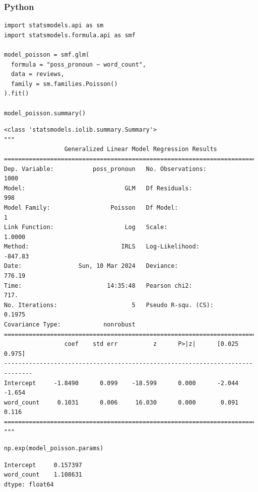 \documentclass[
  letterpaper,
]{krantz}
\begin{document}
\subsubsection{Python}

\begin{verbatim}
import statsmodels.api as sm
import statsmodels.formula.api as smf

model_poisson = smf.glm(
  formula = "poss_pronoun ~ word_count",
  data = reviews,
  family = sm.families.Poisson()
).fit()

model_poisson.summary()        
\end{verbatim}

\begin{verbatim}
<class 'statsmodels.iolib.summary.Summary'>
"""
                 Generalized Linear Model Regression Results                  
==============================================================================
Dep. Variable:           poss_pronoun   No. Observations:                 1000
Model:                            GLM   Df Residuals:                      998
Model Family:                 Poisson   Df Model:                            1
Link Function:                    Log   Scale:                          1.0000
Method:                          IRLS   Log-Likelihood:                -847.83
Date:                Sun, 10 Mar 2024   Deviance:                       776.19
Time:                        14:35:48   Pearson chi2:                     717.
No. Iterations:                     5   Pseudo R-squ. (CS):             0.1975
Covariance Type:            nonrobust                                         
==============================================================================
                 coef    std err          z      P>|z|      [0.025      0.975]
------------------------------------------------------------------------------
Intercept     -1.8490      0.099    -18.599      0.000      -2.044      -1.654
word_count     0.1031      0.006     16.030      0.000       0.091       0.116
==============================================================================
"""
\end{verbatim}

\begin{verbatim}
np.exp(model_poisson.params)
\end{verbatim}

\begin{verbatim}
Intercept     0.157397
word_count    1.108631
dtype: float64
\end{verbatim}
\end{document}

